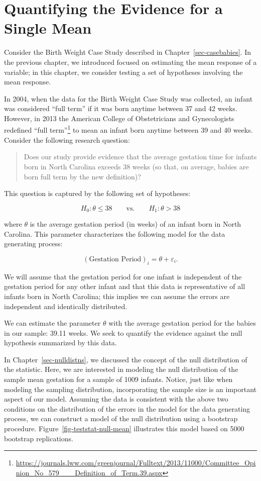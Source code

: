 \documentclass[
  letterpaper,
  DIV=11,
  numbers=noendperiod]{scrreprt}
\theoremstyle{plain}
\theoremstyle{definition}
\theoremstyle{definition}
\theoremstyle{remark}
\begin{document}
\hypertarget{sec-teststat}{%
\chapter{Quantifying the Evidence for a Single
Mean}\label{sec-teststat}}

Consider the Birth Weight Case Study described in
Chapter~\ref{sec-casebabies}. In the previous chapter, we introduced
focused on estimating the mean response of a variable; in this chapter,
we consider testing a set of hypotheses involving the mean response.

In 2004, when the data for the Birth Weight Case Study was collected, an
infant was considered ``full term'' if it was born anytime between 37
and 42 weeks. However, in 2013 the American College of Obstetricians and
Gynecologists redefined ``full term''\footnote{\url{https://journals.lww.com/greenjournal/Fulltext/2013/11000/Committee_Opinion_No_579___Definition_of_Term.39.aspx}}
to mean an infant born anytime between 39 and 40 weeks. Consider the
following research question:

\begin{quote}
Does our study provide evidence that the average gestation time for
infants born in North Carolina exceeds 38 weeks (so that, on average,
babies are born full term by the new definition)?
\end{quote}

This question is captured by the following set of hypotheses:

\[H_0: \theta \leq 38 \qquad \text{vs.} \qquad H_1: \theta > 38\]

where \(\theta\) is the average gestation period (in weeks) of an infant
born in North Carolina. This parameter characterizes the following model
for the data generating process:

\[(\text{Gestation Period})_i = \theta + \varepsilon_i.\]

We will assume that the gestation period for one infant is independent
of the gestation period for any other infant and that this data is
representative of all infants born in North Carolina; this implies we
can assume the errors are independent and identically distributed.

We can estimate the parameter \(\theta\) with the average gestation
period for the babies in our sample: 39.11 weeks. We seek to quantify
the evidence against the null hypothesis summarized by this data.

In Chapter~\ref{sec-nulldistns}, we discussed the concept of the null
distribution of the statistic. Here, we are interested in modeling the
null distribution of the sample mean gestation for a sample of 1009
infants. Notice, just like when modeling the sampling distribution,
incorporating the sample size is an important aspect of our model.
Assuming the data is consistent with the above two conditions on the
distribution of the errors in the model for the data generating process,
we can construct a model of the null distribution using a bootstrap
procedure. Figure~\ref{fig-teststat-null-mean} illustrates this model
based on 5000 bootstrap replications.
\end{document}
